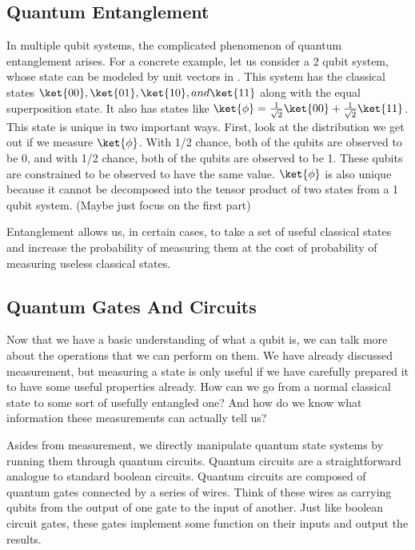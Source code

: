 \subsection{Quantum Entanglement}
In multiple qubit systems, the complicated phenomenon of quantum entanglement arises.
For a concrete example, let us consider a 2 qubit system, whose state can be modeled by unit vectors in .
This system has the classical states $\ket{00}, \ket{01}, \ket{10}, and \ket{11}$ along with the equal superposition state.
It also has states like $\ket{\phi} = \frac{1}{\sqrt{2}}\ket{00} + \frac{1}{\sqrt{2}}\ket{11}$.
This state is unique in two important ways.
First, look at the distribution we get out if we measure $\ket{\phi}$.
With 1/2 chance, both of the qubits are observed to be 0, and with 1/2 chance, both of the qubits are observed to be 1.
These qubits are constrained to be observed to have the same value. 
$\ket{\phi}$ is also unique because it cannot be decomposed into the tensor product of two states from a 1 qubit system. 
(Maybe just focus on the first part)
	
Entanglement allows us, in certain cases, to take a set of useful classical states and increase the probability of measuring them at the cost of probability of measuring useless classical states. 
\subsection{Quantum Gates And Circuits}
Now that we have a basic understanding of what a qubit is, we can talk more about the operations that we can perform on them.
We have already discussed measurement, but measuring a state is only useful if we have carefully prepared it to have some useful properties already.
How can we go from a normal classical state to some sort of usefully entangled one?
And how do we know what information these measurements can actually tell us?

Asides from measurement, we directly manipulate quantum state systems by running them through quantum circuits.
Quantum circuits are a straightforward analogue to standard boolean circuits.
Quantum circuits are composed of quantum gates connected by a series of wires.
Think of these wires as carrying qubits from the output of one gate to the input of another.
Just like boolean circuit gates, these gates implement some function on their inputs and output the results. 

